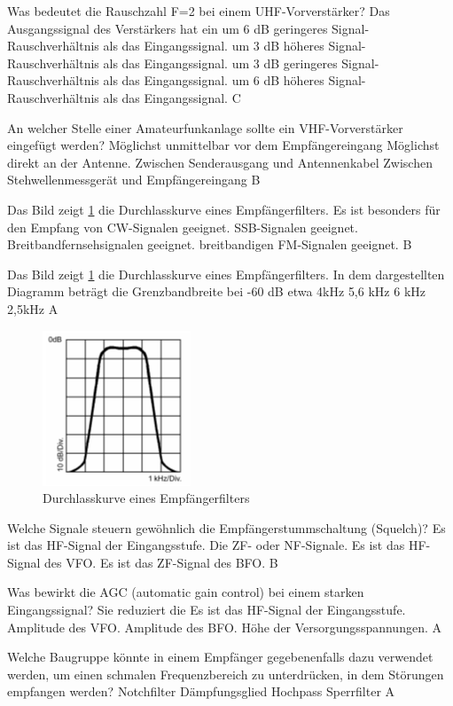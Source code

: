 {Was bedeutet die Rauschzahl F=2 bei einem UHF-Vorverstärker? Das Ausgangssignal des Verstärkers hat ein}%
{um 6 dB geringeres Signal-Rauschverhältnis als das Eingangssignal.}%
{um 3 dB höheres Signal-Rauschverhältnis als das Eingangssignal.}%
{um 3 dB geringeres Signal-Rauschverhältnis als das Eingangssignal.}%
{um 6 dB höheres Signal-Rauschverhältnis als das Eingangssignal.}%
{C}%

{An welcher Stelle einer Amateurfunkanlage sollte ein VHF-Vorverstärker eingefügt werden?}%
{Möglichst unmittelbar vor dem Empfängereingang}%
{Möglichst direkt an der Antenne.}%
{Zwischen Senderausgang und Antennenkabel}%
{Zwischen Stehwellenmessgerät und Empfängereingang}%
{B}%

{Das Bild zeigt \ref{Durchlasskurve} die Durchlasskurve eines Empfängerfilters.  Es ist besonders für den Empfang von}%
{CW-Signalen geeignet.}%
{SSB-Signalen geeignet.}%
{Breitbandfernsehsignalen geeignet.}%
{breitbandigen FM-Signalen geeignet.}%
{B}%

{Das Bild zeigt \ref{Durchlasskurve} die Durchlasskurve eines Empfängerfilters.  In dem dargestellten Diagramm beträgt die Grenzbandbreite bei -60 dB etwa}%
{4kHz}%
{5,6 kHz}%
{6 kHz}%
{2,5kHz}%
{A}%

\begin{figure}[H]
	\centering
	\includegraphics[scale=0.9]{Geraetetechnik/Bilder/TF410.png}
	\caption{Durchlasskurve eines Empfängerfilters}
	\label{Durchlasskurve}
	\end{figure}


{Welche Signale steuern gewöhnlich die Empfängerstummschaltung (Squelch)?}%
{Es ist das HF-Signal der Eingangsstufe.}%
{Die ZF- oder NF-Signale.}%
{Es ist das HF-Signal des VFO.}%
{Es ist das ZF-Signal des BFO.}%
{B}%

{Was bewirkt die AGC (automatic gain control) bei einem starken Eingangssignal? Sie reduziert die}%
{Es ist das HF-Signal der Eingangsstufe.}%
{Amplitude des VFO.}%
{Amplitude des BFO.}%
{Höhe der Versorgungsspannungen.}%
{A}%

{Welche Baugruppe könnte in einem Empfänger gegebenenfalls dazu verwendet werden, um einen schmalen Frequenzbereich zu unterdrücken, in dem Störungen empfangen werden?}%
{Notchfilter}%
{Dämpfungsglied}%
{Hochpass}%
{Sperrfilter}%
{A}%

